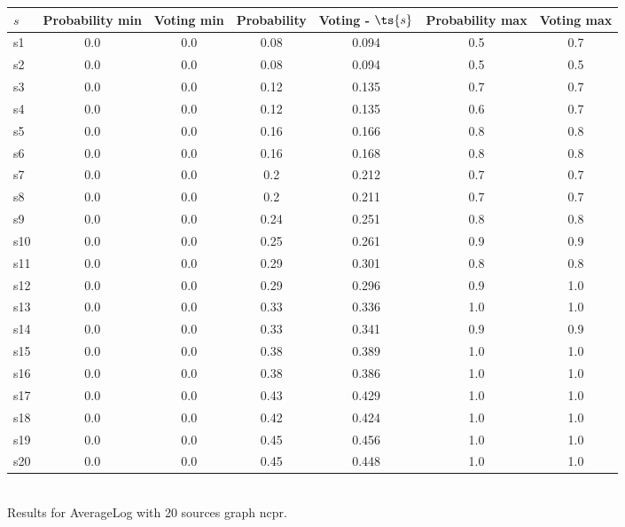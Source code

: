 \documentclass{article}
\begin{document}
\noindent\begin{tabular}{|l|c|c|c|c|c|c|}
\hline
$s$& Probability min & Voting min & Probability & Voting - $\ts{s}$ & Probability max & Voting max\\
\hline
s1 &0.0 & 0.0 & 0.08 & 0.094 & 0.5 & 0.7\\
\hline
s2 &0.0 & 0.0 & 0.08 & 0.094 & 0.5 & 0.5\\
\hline
s3 &0.0 & 0.0 & 0.12 & 0.135 & 0.7 & 0.7\\
\hline
s4 &0.0 & 0.0 & 0.12 & 0.135 & 0.6 & 0.7\\
\hline
s5 &0.0 & 0.0 & 0.16 & 0.166 & 0.8 & 0.8\\
\hline
s6 &0.0 & 0.0 & 0.16 & 0.168 & 0.8 & 0.8\\
\hline
s7 &0.0 & 0.0 & 0.2 & 0.212 & 0.7 & 0.7\\
\hline
s8 &0.0 & 0.0 & 0.2 & 0.211 & 0.7 & 0.7\\
\hline
s9 &0.0 & 0.0 & 0.24 & 0.251 & 0.8 & 0.8\\
\hline
s10 &0.0 & 0.0 & 0.25 & 0.261 & 0.9 & 0.9\\
\hline
s11 &0.0 & 0.0 & 0.29 & 0.301 & 0.8 & 0.8\\
\hline
s12 &0.0 & 0.0 & 0.29 & 0.296 & 0.9 & 1.0\\
\hline
s13 &0.0 & 0.0 & 0.33 & 0.336 & 1.0 & 1.0\\
\hline
s14 &0.0 & 0.0 & 0.33 & 0.341 & 0.9 & 0.9\\
\hline
s15 &0.0 & 0.0 & 0.38 & 0.389 & 1.0 & 1.0\\
\hline
s16 &0.0 & 0.0 & 0.38 & 0.386 & 1.0 & 1.0\\
\hline
s17 &0.0 & 0.0 & 0.43 & 0.429 & 1.0 & 1.0\\
\hline
s18 &0.0 & 0.0 & 0.42 & 0.424 & 1.0 & 1.0\\
\hline
s19 &0.0 & 0.0 & 0.45 & 0.456 & 1.0 & 1.0\\
\hline
s20 &0.0 & 0.0 & 0.45 & 0.448 & 1.0 & 1.0\\
\hline
\end{tabular}\\

\noindent Results for AverageLog with 20 sources graph ncpr.
\end{document}

